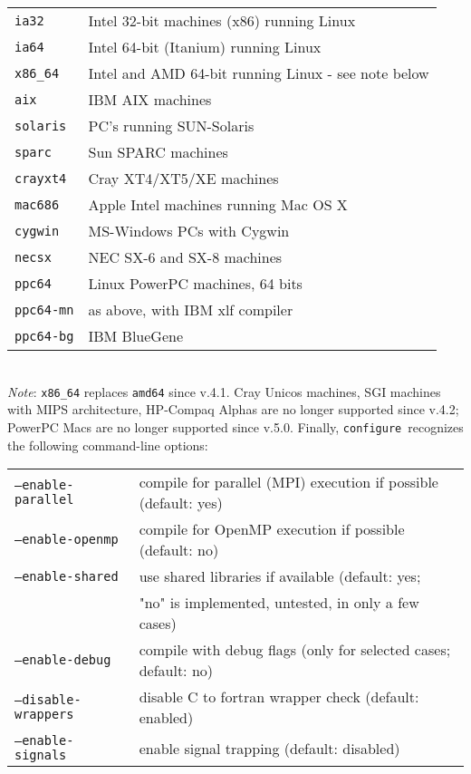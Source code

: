 \documentclass[12pt,a4paper]{article}
\def\configure{\texttt{configure}}
\begin{document}
\begin{tabular}{ll}
\texttt{ia32}&    Intel 32-bit machines (x86) running Linux\\
\texttt{ia64}&    Intel 64-bit (Itanium) running Linux\\
\texttt{x86\_64}&  Intel and AMD 64-bit running Linux - see note below\\
\texttt{aix}&     IBM AIX machines\\
\texttt{solaris}& PC's running SUN-Solaris\\
\texttt{sparc}&   Sun SPARC machines\\
\texttt{crayxt4}& Cray XT4/XT5/XE machines\\
\texttt{mac686}&  Apple Intel machines running Mac OS X\\
\texttt{cygwin}&  MS-Windows PCs with Cygwin\\
\texttt{necsx}&   NEC SX-6 and SX-8 machines\\
\texttt{ppc64}&   Linux PowerPC machines, 64 bits\\
\texttt{ppc64-mn}&as above, with IBM xlf compiler\\
\texttt{ppc64-bg}&IBM BlueGene
\end{tabular}\\
{\em Note}: \texttt{x86\_64} replaces \texttt{amd64} since v.4.1. 
Cray Unicos machines, SGI 
machines with MIPS architecture, HP-Compaq Alphas are no longer supported
since v.4.2; PowerPC Macs are no longer
supported since v.5.0.
Finally, \configure\ recognizes the following command-line options:\\
\begin{tabular}{ll}
\texttt{--enable-parallel}&     compile for parallel (MPI) execution if possible (default: yes)\\
\texttt{--enable-openmp}&       compile for OpenMP execution if possible (default: no)\\
\texttt{--enable-shared}&       use shared libraries if available (default: yes;\\
                        &       "no" is implemented, untested, in only a few cases)\\
\texttt{--enable-debug}&        compile with debug flags (only for selected cases; default: no)\\
\texttt{--disable-wrappers}&    disable C to fortran wrapper check (default: enabled)\\
\texttt{--enable-signals}&      enable signal trapping (default: disabled)\\
\end{tabular}\\
\end{document}
